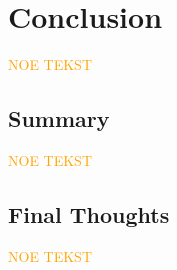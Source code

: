 \chapter{Conclusion}\label{chap:conclusion}

\textcolor{orange}{NOE TEKST}
\begin{comment}
    FRA PRESENTASJON OM KONKLUSJON:
    1. Gå tilbake til temaet
    2. Gjenoppgi hovedpåstanden eller gjenta problemstillingen
    3. Oppsummering av ideene som er diskutert
    4. Oppsummerende sluttpoeng:
        - Forsterke hovedbudskapet
        - Gi en tankevekker eller refleksjon
        - Peke på videre implikasjoner
\end{comment}

\section{Summary}\label{sec:summary}

\textcolor{orange}{NOE TEKST}

\section{Final Thoughts}\label{sec:finalthoughts}

\textcolor{orange}{NOE TEKST}
